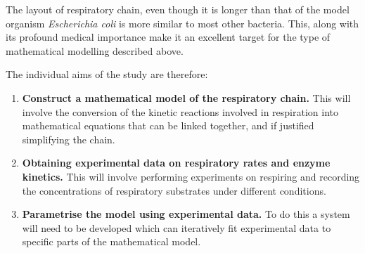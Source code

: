 The layout of \Nm{} respiratory chain, even though it is longer than that of the model organism \textit{Escherichia coli} is more similar to most other bacteria. This, along with its profound medical importance make it an excellent target for the type of mathematical modelling described above.

The individual aims of the study are therefore:
\begin{enumerate}
\item {\bf Construct a mathematical model of the \Nm{} respiratory chain.} This will involve the conversion of the kinetic reactions involved in respiration into mathematical equations that can be linked together, and if justified simplifying the chain.
\item {\bf Obtaining experimental data on respiratory rates and enzyme kinetics.} This will involve performing experiments on respiring \Nm{} and recording the concentrations of respiratory substrates under different conditions.
\item {\bf Parametrise the model using experimental data.} To do this a system will need to be developed which can iteratively fit experimental data to specific parts of the mathematical model.
\end{enumerate}
